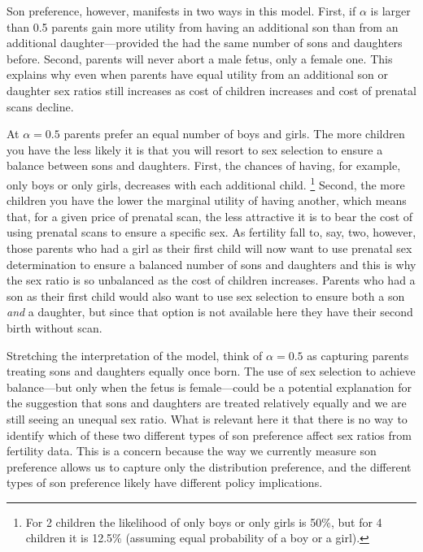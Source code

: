 \documentclass[12pt,letterpaper]{article}
\begin{document}
Son preference, however, manifests in two ways in this model.
First, if $\alpha$ is larger than 0.5 parents gain more utility
from having an additional son than from an additional daughter---provided
the had the same number of sons and daughters before.
Second, parents will never abort a male fetus, only a female one.
This explains why even when parents have equal utility from an additional
son or daughter sex ratios still increases as cost of children 
increases and cost of prenatal scans decline.

At $\alpha = 0.5$ parents prefer an equal number of boys and girls.
The more children you have the less likely it is that you will
resort to sex selection to ensure a balance between sons and daughters.
First, the chances of having, for example, only boys or only
girls, decreases with each additional child.%
\footnote{
For 2 children the likelihood of only boys or only girls
is 50\%, but for 4 children it is 12.5\% (assuming equal probability
of a boy or a girl).
}
Second, the more children you have the lower the marginal
utility of having another, which means that, for a given price
of prenatal scan, the less attractive it is to bear the cost of using
prenatal scans to ensure a specific sex.
As fertility fall to, say, two, however, those parents who had a girl as their 
first child will now want to use prenatal sex determination to 
ensure a balanced number of sons and daughters and this is why
the sex ratio is so unbalanced as the cost of children increases.
Parents who had a son as their first child would also want to
use sex selection to ensure both a son \emph{and} a daughter, but since
that option is not available here they have their
second birth without scan.

Stretching the interpretation of the model, think of $\alpha=0.5$ 
as capturing parents treating sons and daughters equally once born.
The use of sex selection to achieve balance---but only when the
fetus is female---could be a potential explanation for the
suggestion that sons and daughters are treated relatively equally and 
we are still seeing an unequal sex ratio.
What is relevant here it that there is no way to identify which 
of these two different types of son preference affect sex ratios 
from fertility data.
This is a concern because the way we currently measure son preference
allows us to capture only the distribution preference, and 
the different types of son preference likely have different policy 
implications.

\end{document}
